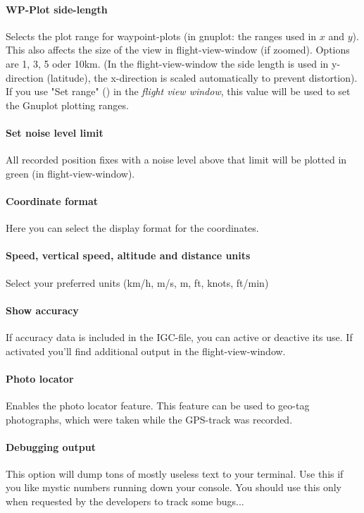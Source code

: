 \paragraph{WP-Plot side-length}
Selects the plot range for waypoint-plots (in gnuplot: the ranges used in $x$ and $y$).
This also affects the size of the view in flight-view-window (if zoomed).
Options are 1, 3, 5 oder 10km. (In the flight-view-window the side length
is used in y-direction (latitude), the x-direction is scaled automatically to
prevent distortion).
If you use "Set range" () in the \emph{flight view window}, this value will be used to set the
Gnuplot plotting ranges.

\paragraph{Set noise level limit}
All recorded position fixes with a noise level above that limit will be
plotted in green (in flight-view-window).

\paragraph{Coordinate format}
Here you can select the display format for the coordinates.

\paragraph{Speed, vertical speed, altitude and distance units}
Select your preferred units (km/h, m/s, m, ft, knots, ft/min)

\paragraph{Show accuracy}
If accuracy data is included in the IGC-file, you can active or deactive its use.
If activated you'll find additional output in the flight-view-window.

\paragraph{Photo locator}
Enables the photo locator feature. This feature can be used to geo-tag photographs, which were taken while the GPS-track was recorded.

\paragraph{Debugging output}
This option will dump tons of mostly useless text to your terminal. Use this if you like mystic numbers running down
your console. You should use this only when requested by the developers to track some bugs...

